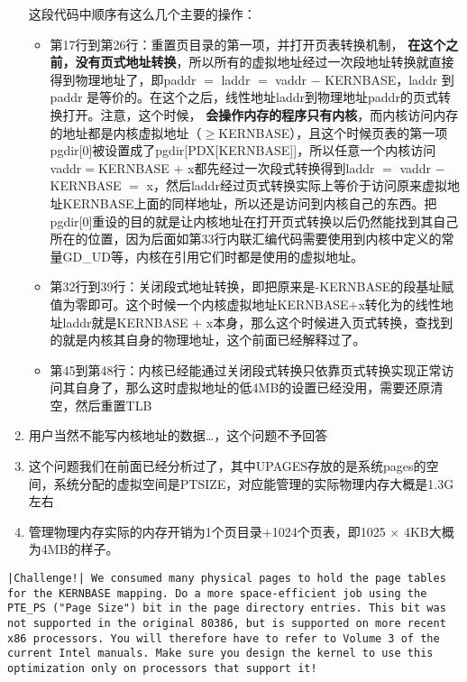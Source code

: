 \documentclass{article}
\newcommand{\highlight}[1]{{\bfseries \color{red}  #1}}
\begin{document}
\begin{CJK*}{UTF8}{gkai}
\begin{enumerate}
{这段代码中顺序有这么几个主要的操作：
\begin{itemize}
\item{第17行到第26行：重置页目录的第一项，并打开页表转换机制，\highlight{在这个之前，没有页式地址转换}，所以所有的虚拟地址经过一次段地址转换就直接得到物理地址了，即paddr $=$ laddr $=$ vaddr $-$ KERNBASE，laddr 到 paddr 是等价的。在这个之后，线性地址laddr到物理地址paddr的页式转换打开。注意，这个时候，\highlight{会操作内存的程序只有内核}，而内核访问内存的地址都是内核虚拟地址（$\geq$KERNBASE），且这个时候页表的第一项pgdir[0]被设置成了pgdir[PDX[KERNBASE]]，所以任意一个内核访问vaddr$=$KERNBASE $+$ x都先经过一次段式转换得到laddr $=$ vaddr $-$ KERNBASE $=$ x，然后laddr经过页式转换实际上等价于访问原来虚拟地址KERNBASE上面的同样地址，所以还是访问到内核自己的东西。把pgdir[0]重设的目的就是让内核地址在打开页式转换以后仍然能找到其自己所在的位置，因为后面如第33行内联汇编代码需要使用到内核中定义的常量GD\_UD等，内核在引用它们时都是使用的虚拟地址。}
\item{第32行到39行：关闭段式地址转换，即把原来是-KERNBASE的段基址赋值为零即可。这个时候一个内核虚拟地址KERNBASE$+$x转化为的线性地址laddr就是KERNBASE $+$ x本身，那么这个时候进入页式转换，查找到的就是内核其自身的物理地址，这个前面已经解释过了。}
\item{第45到第48行：内核已经能通过关闭段式转换只依靠页式转换实现正常访问其自身了，那么这时虚拟地址的低4MB的设置已经没用，需要还原清空，然后重置TLB}
\end{itemize}
}

\item{用户当然不能写内核地址的数据\ldots，这个问题不予回答}
\item{这个问题我们在前面已经分析过了，其中UPAGES存放的是系统pages的空间，系统分配的虚拟空间是PTSIZE，对应能管理的实际物理内存大概是1.3G左右}
\item{管理物理内存实际的内存开销为1个页目录+1024个页表，即1025 $\times$ 4KB大概为4MB的样子。}
\end{enumerate}

\begin{lstlisting}[style=challenge]
|Challenge!| We consumed many physical pages to hold the page tables for the KERNBASE mapping. Do a more space-efficient job using the PTE_PS ("Page Size") bit in the page directory entries. This bit was not supported in the original 80386, but is supported on more recent x86 processors. You will therefore have to refer to Volume 3 of the current Intel manuals. Make sure you design the kernel to use this optimization only on processors that support it!
\end{lstlisting}


\end{CJK*}
\end{document}
